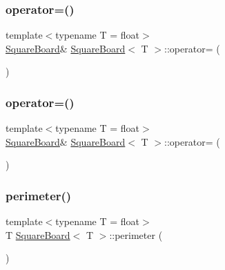 \mbox{\label{classSquareBoard_a15fd0ca02b5be393b75228123be1d2c8}} 
\subsubsection{\texorpdfstring{operator=()}{operator=()}\hspace{0.1cm}{\footnotesize\ttfamily [3/4]}}
{\footnotesize\ttfamily template$<$typename T  = float$>$ \\
\mbox{\hyperlink{classSquareBoard}{Square\+Board}}\& \mbox{\hyperlink{classSquareBoard}{Square\+Board}}$<$ T $>$\+::operator= (\begin{DoxyParamCaption}\item[{const \mbox{\hyperlink{classSquareBoard}{Square\+Board}}$<$ T $>$ \&}]{ }\end{DoxyParamCaption})\hspace{0.3cm}{\ttfamily [default]}}

\mbox{\label{classSquareBoard_a15fd0ca02b5be393b75228123be1d2c8}} 
\subsubsection{\texorpdfstring{operator=()}{operator=()}\hspace{0.1cm}{\footnotesize\ttfamily [4/4]}}
{\footnotesize\ttfamily template$<$typename T  = float$>$ \\
\mbox{\hyperlink{classSquareBoard}{Square\+Board}}\& \mbox{\hyperlink{classSquareBoard}{Square\+Board}}$<$ T $>$\+::operator= (\begin{DoxyParamCaption}\item[{const \mbox{\hyperlink{classSquareBoard}{Square\+Board}}$<$ T $>$ \&}]{ }\end{DoxyParamCaption})\hspace{0.3cm}{\ttfamily [default]}}

\mbox{\label{classSquareBoard_a8b2ae6ea7295b2bff171b3d6311a456c}} 
\subsubsection{\texorpdfstring{perimeter()}{perimeter()}\hspace{0.1cm}{\footnotesize\ttfamily [1/2]}}
{\footnotesize\ttfamily template$<$typename T  = float$>$ \\
T \mbox{\hyperlink{classSquareBoard}{Square\+Board}}$<$ T $>$\+::perimeter (\begin{DoxyParamCaption}{ }\end{DoxyParamCaption})}

